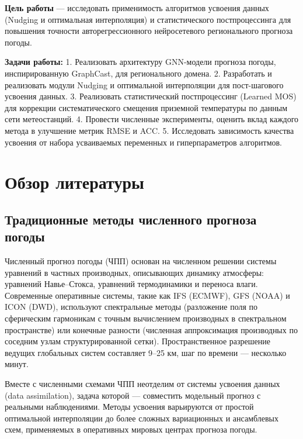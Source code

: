 \documentclass[14pt,a4paper]{extarticle}
\numberwithin{table}{section}
\numberwithin{figure}{section}
\numberwithin{equation}{section}
\begin{document}
\textbf{Цель работы} --- исследовать применимость алгоритмов усвоения
данных (Nudging и оптимальная интерполяция) и статистического
постпроцессинга для повышения точности авторегрессионного
нейросетевого регионального прогноза погоды.

\textbf{Задачи работы:} 1. Реализовать архитектуру GNN-модели прогноза
погоды, инспирированную GraphCast, для регионального домена. 2.
Разработать и реализовать модули Nudging и оптимальной интерполяции для
пост-шагового усвоения данных. 3. Реализовать статистический
постпроцессинг (Learned MOS) для коррекции систематического смещения
приземной температуры по данным сети метеостанций. 4. Провести
численные эксперименты, оценить вклад каждого метода в улучшение метрик
RMSE и ACC. 5. Исследовать зависимость качества усвоения от набора
усваиваемых переменных и гиперпараметров алгоритмов.


\newpage

\section{Обзор литературы}

\subsection{Традиционные методы численного прогноза погоды}\label{ux442ux440ux430ux434ux438ux446ux438ux43eux43dux43dux44bux435-ux43cux435ux442ux43eux434ux44b-ux447ux438ux441ux43bux435ux43dux43dux43eux433ux43e-ux43fux440ux43eux433ux43dux43eux437ux430-ux43fux43eux433ux43eux434ux44b}

Численный прогноз погоды (ЧПП) основан на численном решении системы
уравнений в частных производных, описывающих динамику атмосферы:
уравнений Навье--Стокса, уравнений термодинамики и переноса влаги.
Современные оперативные системы, такие как IFS (ECMWF), GFS (NOAA) и
ICON (DWD), используют спектральные методы (разложение поля по
сферическим гармоникам с точным вычислением производных в спектральном
пространстве) или конечные разности (численная аппроксимация
производных по соседним узлам структурированной сетки).
Пространственное разрешение ведущих глобальных систем составляет
9--25 км, шаг по времени --- несколько минут.

Вместе с численными схемами ЧПП неотделим от системы усвоения данных
(data assimilation), задача которой --- совместить модельный прогноз
с реальными наблюдениями. Методы усвоения варьируются от простой
оптимальной интерполяции до более сложных вариационных и ансамблевых
схем, применяемых в оперативных мировых центрах прогноза погоды.
\end{document}
